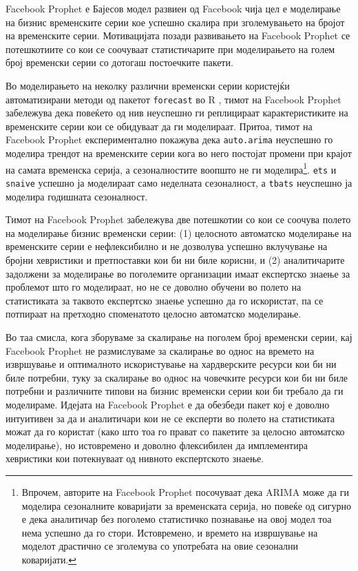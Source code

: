 \documentclass[12pt]{article}
\numberwithin{equation}{section}
\begin{document}
Facebook Prophet е Бајесов модел развиен од Facebook чија цел е моделирање на бизнис временските серии кое успешно скалира при зголемувањето на бројот на временските серии. Мотивацијата позади развивањето на Facebook Prophet се потешкотиите со кои се соочуваат статистичарите при моделирањето на голем број временски серии со дотогаш постоечките пакети.

Во моделирањето на неколку различни временски серии користејќи автоматизирани методи од пакетот \verb|forecast| во R \cite{hyndman2007automatic, hyndman2024}, тимот на Facebook Prophet забележува дека повеќето од нив неуспешно ги реплицираат карактеристиките на временските серии кои се обидуваат да ги моделираат. Притоа, тимот на Facebook Prophet експериментално покажува дека \verb|auto.arima| неуспешно го моделира трендот на временските серии кога во него постојат промени при крајот на самата временска серија, а сезоналностите воопшто не ги моделира\footnote{Впрочем, авторите на Facebook Prophet \cite{taylor2018forecasting} посочуваат дека ARIMA може да ги моделира сезоналните коваријати за временската серија, но повеќе од сигурно е дека аналитичар без поголемо статистичко познавање на овој модел тоа нема успешно да го стори. Истовремено, и времето на извршување на моделот драстично се зголемува со употребата на овие сезонални коваријати.}. \verb|ets| \cite{hyndman2002state} и \verb|snaive| успешно ја моделираат само неделната сезоналност, а \verb|tbats| \cite{de2011forecasting} неуспешно ја моделира годишната сезоналност.

Тимот на Facebook Prophet забележува две потешкотии со кои се соочува полето на моделирање бизнис временски серии: (1) целосното автоматско моделирање на временските серии е нефлексибилно и не дозволува успешно вклучување на бројни хевристики и претпоставки кои би ни биле корисни, и (2) аналитичарите задолжени за моделирање во поголемите организации имаат експертско знаење за проблемот што го моделираат, но не се доволно обучени во полето на статистиката за таквото експертско знаење успешно да го искористат, па се потпираат на претходно споменатото целосно автоматско моделирање.

Во таа смисла, кога зборуваме за скалирање на поголем број временски серии, кај Facebook Prophet не размислуваме за скалирање во однос на времето на извршување и оптималното искористување на хардверските ресурси кои би ни биле потребни, туку за скалирање во однос на човечките ресурси кои би ни биле потребни и различните типови на бизнис временски серии кои би требало да ги моделираме. Идејата на Facebook Prophet е да обезбеди пакет кој е доволно интуитивен за да и аналитичари кои не се експерти во полето на статистиката можат да го користат (како што тоа го прават со пакетите за целосно автоматско моделирање), но истовремено и доволно флексибилен да имплементира хевристики кои потекнуваат од нивното експертското знаење.
\end{document}
